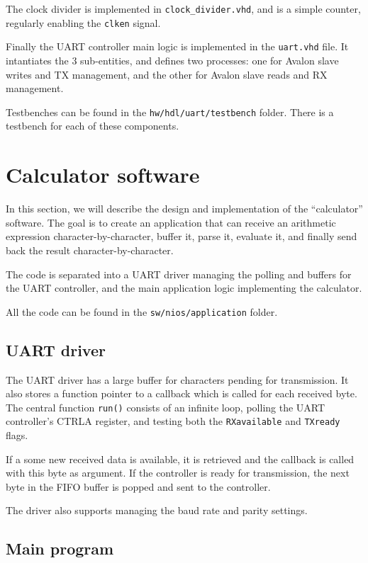\documentclass[12pt,a4paper]{article}
\begin{document}
The clock divider is implemented in \texttt{clock\_divider.vhd}, and is a simple counter, regularly enabling the \texttt{clken} signal.

Finally the UART controller main logic is implemented in the \texttt{uart.vhd} file. It intantiates the 3 sub-entities, and defines two processes: one for Avalon slave writes and TX management, and the other for Avalon slave reads and RX management.

Testbenches can be found in the \texttt{hw/hdl/uart/testbench} folder. There is a testbench for each of these components.


\section{Calculator software}

In this section, we will describe the design and implementation of the ``calculator'' software. The goal is to create an application that can receive an arithmetic expression character-by-character, buffer it, parse it, evaluate it, and finally send back the result character-by-character. 

The code is separated into a UART driver managing the polling and buffers for the UART controller, and the main application logic implementing the calculator.

All the code can be found in the \texttt{sw/nios/application} folder.

\subsection{UART driver}

The UART driver has a large buffer for characters pending for transmission. It also stores a function pointer to a callback which is called for each received byte. The central function \texttt{run()} consists of an infinite loop, polling the UART controller's CTRLA register, and testing both the \texttt{RXavailable} and \texttt{TXready} flags.

If a some new received data is available, it is retrieved and the callback is called with this byte as argument. If the controller is ready for transmission, the next byte in the FIFO buffer is popped and sent to the controller.

The driver also supports managing the baud rate and parity settings.

\subsection{Main program}
\end{document}
